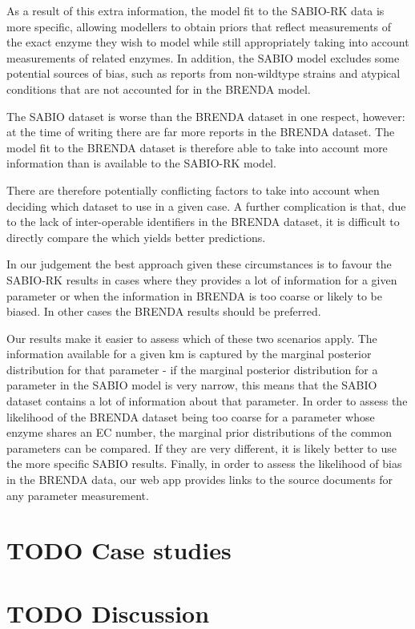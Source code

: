 \documentclass[11pt]{article}
\begin{document}
As a result of this extra information, the model fit to the SABIO-RK data is
more specific, allowing modellers to obtain priors that reflect measurements of
the exact enzyme they wish to model while still appropriately taking into
account measurements of related enzymes. In addition, the SABIO model excludes
some potential sources of bias, such as reports from non-wildtype strains and
atypical conditions that are not accounted for in the BRENDA model.

The SABIO dataset is worse than the BRENDA dataset in one respect, however: at
the time of writing there are far more reports in the BRENDA dataset. The model
fit to the BRENDA dataset is therefore able to take into account more
information than is available to the SABIO-RK model.

There are therefore potentially conflicting factors to take into account when
deciding which dataset to use in a given case. A further complication is that,
due to the lack of inter-operable identifiers in the BRENDA dataset, it is
difficult to directly compare the which yields better predictions.

In our judgement the best approach given these circumstances is to favour the
SABIO-RK results in cases where they provides a lot of information for a given
parameter or when the information in BRENDA is too coarse or likely to be
biased. In other cases the BRENDA results should be preferred.

Our results make it easier to assess which of these two scenarios apply. The
information available for a given km is captured by the marginal posterior
distribution for that parameter - if the marginal posterior distribution for a
parameter in the SABIO model is very narrow, this means that the SABIO dataset
contains a lot of information about that parameter. In order to assess the
likelihood of the BRENDA dataset being too coarse for a parameter whose enzyme
shares an EC number, the marginal prior distributions of the common parameters
can be compared. If they are very different, it is likely better to use the more
specific SABIO results. Finally, in order to assess the likelihood of bias in
the BRENDA data, our web app provides links to the source documents for any
parameter measurement.

\section{{\bfseries\sffamily TODO} Case studies}
\label{sec:org8b95ff0}
\section{{\bfseries\sffamily TODO} Discussion}
\label{sec:orgb9dae09}
\end{document}
